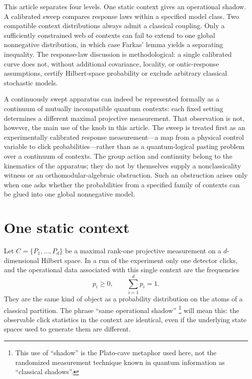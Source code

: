 \documentclass[aps,pra,reprint,superscriptaddress,nofootinbib,floatfix]{revtex4-2}
\begin{document}
This article separates four levels.  One static context gives an operational
shadow.  A calibrated sweep compares response laws within a specified model
class.  Two compatible context distributions always admit a classical
coupling.  Only a sufficiently constrained web of contexts can fail to extend
to one global nonnegative distribution, in which case Farkas' lemma yields a
separating inequality.  The response-law discussion is methodological: a
single calibrated curve does not, without additional covariance, locality, or
ontic-response assumptions, certify Hilbert-space probability or exclude
arbitrary classical stochastic models.

A continuously swept apparatus can indeed be represented formally as a
continuum of mutually incompatible quantum contexts: each fixed setting
determines a different maximal projective measurement.  That observation is
not, however, the main use of the knob in this article.  The sweep is treated
first as an experimentally calibrated response measurement---a map from a
physical control variable to click probabilities---rather than as a
quantum-logical pasting problem over a continuum of contexts.  The group
action and continuity belong to the kinematics of the apparatus; they do not
by themselves supply a nonclassicality witness or an
orthomodular-algebraic obstruction.  Such an obstruction arises only when one
asks whether the probabilities from a specified family of contexts can be
glued into one global nonnegative model.

\section{One static context}

Let \(C=\{P_1,\ldots,P_d\}\) be a maximal rank-one projective
measurement on a \(d\)-dimensional Hilbert space.  In a run of the experiment
only one detector clicks, and the operational data associated with this
single context are the frequencies
\begin{equation}
        p_i\ge 0,\qquad \sum_{i=1}^d p_i=1 .
\end{equation}
They are the same kind of object as a probability distribution on the atoms
of a classical partition.  The phrase ``same operational shadow''%
\footnote{This use of ``shadow'' is the Plato-cave metaphor used here, not
the randomized measurement technique known in quantum information as
``classical shadows''.}
will mean this: the observable click statistics in the context are identical,
even if the underlying state spaces used to generate them are different.
\end{document}
